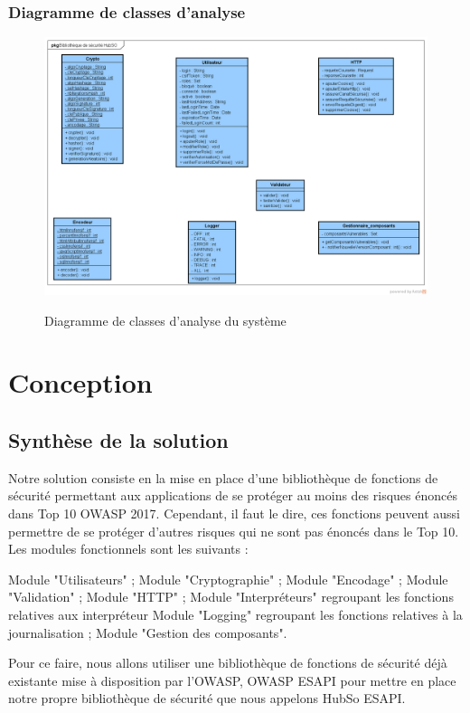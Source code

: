 \subsubsection{Diagramme de classes d'analyse}
\begin{figure}[H]
	\centering
	\begin{minipage}{12cm}
		\centering
		{\includegraphics[height=0.5\textheight, width=1.2\textwidth]{fig/Analyse-Class-Diagram.png}}
	\end{minipage}
	\caption{Diagramme de classes d'analyse du système}
	\label{fig:7.20}
\end{figure}

\section{Conception}
\subsection{Synthèse de la solution}
Notre solution consiste en la mise en place d'une bibliothèque de fonctions de sécurité permettant aux applications de se protéger au moins des risques énoncés dans Top 10 OWASP 2017. Cependant, il faut le dire, ces fonctions peuvent aussi permettre de se protéger d'autres risques qui ne sont pas énoncés dans le Top 10. Les modules fonctionnels sont les suivants :
\begin{itemize}
	\itemcheck Module "Utilisateurs" ;
	\itemcheck Module "Cryptographie" ; 
	\itemcheck Module "Encodage" ; 
	\itemcheck Module "Validation" ; 
	\itemcheck Module "HTTP" ;
	\itemcheck Module "Interpréteurs" regroupant les fonctions relatives aux interpréteur
	\itemcheck Module "Logging" regroupant les fonctions relatives à la journalisation ; 
	\itemcheck Module "Gestion des composants".
\end{itemize}
Pour ce faire, nous allons utiliser une bibliothèque de fonctions de sécurité déjà existante mise à disposition par l'OWASP, OWASP ESAPI pour mettre en place notre propre bibliothèque de sécurité que nous appelons HubSo ESAPI.
